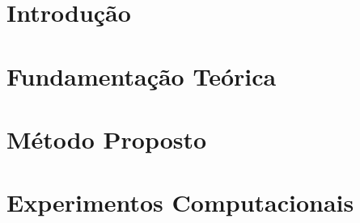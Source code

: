 \documentclass[a4paper,12pt,oneside,openany]{book}
\begin{document}
\frontmatter
\thispagestyle{empty}



\pagebreak            



     \tableofcontents
\listoffigures
\listoftables

\mainmatter
\cleardoublepage
\chapter{Introdução}
\label{cap1}


\chapter{Fundamentação Teórica}
\label{cap2}


\chapter{Método Proposto}
\label{cap3}


\chapter{Experimentos Computacionais}
\label{cap4}

\end{document}
